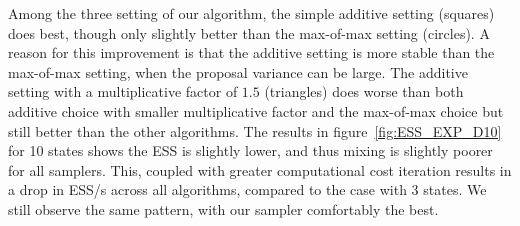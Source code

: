 Among the three setting of our algorithm, the simple additive setting
 ({squares}) does best, though only slightly better than the {max-of-max} setting (circles). 
A reason for this improvement is that the additive setting is more stable than the max-of-max setting, when the proposal variance can be large. 
The {additive setting with a multiplicative factor of $1.5$} ({triangles}) does worse than both {additive choice with smaller multiplicative factor and the max-of-max choice} but still better than the other algorithms. 
The results in figure~\ref{fig:ESS_EXP_D10} for 10 states shows the ESS is slightly lower, and thus mixing is slightly poorer for all samplers. This, coupled with greater computational cost iteration results in a drop in ESS/s across all algorithms, compared to the case with 3 states. We still observe the same pattern, with our sampler comfortably the best. 

